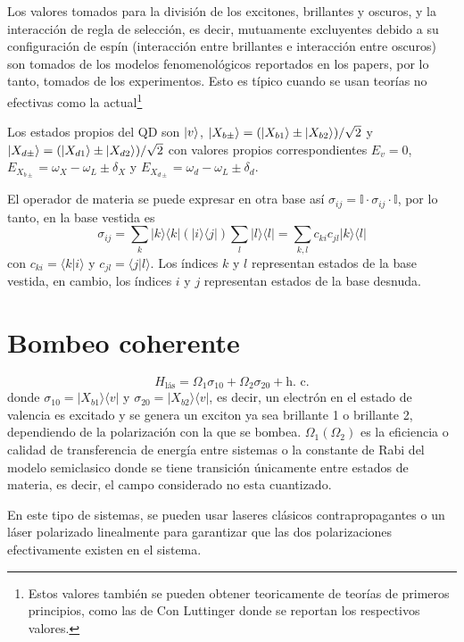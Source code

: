 \documentclass[../main.tex]{subfiles}
\begin{document}
Los valores tomados para la división de los excitones, brillantes y oscuros, y la interacción de regla de selección, es decir, mutuamente excluyentes debido a su configuración de espín (interacción entre brillantes e interacción entre oscuros) son tomados de los modelos fenomenológicos reportados en los papers, por lo tanto, tomados de los experimentos. Esto es típico cuando se usan teorías no efectivas como la actual\footnote{Estos valores también se pueden obtener teoricamente de teorías de primeros principios, como las de Con Luttinger donde se reportan los respectivos valores.}

Los estados propios del QD son $\ket{v}$, $\ket{X_{b\pm}} = (\ket{X_{b1}} \pm \ket{X_{b2}})/\sqrt{2}$ y $\ket{X_{d\pm}} = (\ket{X_{d1}} \pm \ket{X_{d2}})/\sqrt{2}$ con valores propios correspondientes $E_v = 0$, $E_{X_{b\pm}} = \omega_X - \omega_L \pm \delta_X$ y $E_{X_{d\pm}} = \omega_d - \omega_L \pm \delta_d$.

El operador de materia se puede expresar en otra base así $\sigma_{ij} = \mathbb{I} \cdot \sigma_{ij} \cdot \mathbb{I}$, por lo tanto, en la base vestida es
\begin{equation}
\sigma_{ij}= 
\sum_k |k\rangle\langle k|(|i\rangle \langle j|) \sum_l |l\rangle\langle l| = \sum_{k,l} c_{ki} c_{jl} |k\rangle\langle l| 
\end{equation}
con $c_{ki} = \langle k|i\rangle$ y $c_{jl} = \langle j|l\rangle$. Los índices $k$ y $l$ representan estados de la base vestida, en cambio, los índices $i$ y $j$ representan estados de la base desnuda.
\section{Bombeo coherente}
$$H_\text{l\'as} = \Omega_1 \sigma_{10} + \Omega_2 \sigma_{20} + \text{h. c.}$$
donde $\sigma_{10}=|X_{b1}\rangle\langle v|$  y $\sigma_{20}=|X_{b2}\rangle\langle v|$, es decir, un electrón en el estado de valencia es excitado y se genera un exciton ya sea brillante 1 o brillante 2, dependiendo de la polarización con la que se bombea. $\Omega_1 (\Omega_2)$ es la eficiencia o calidad de transferencia de energía entre sistemas o la constante de Rabi del modelo semiclasico donde se tiene transición  únicamente entre estados de materia, es decir, el campo considerado no esta cuantizado.

En este tipo de sistemas, se pueden usar laseres clásicos contrapropagantes o un láser polarizado linealmente para garantizar que las dos polarizaciones efectivamente existen en el sistema.
\end{document}
